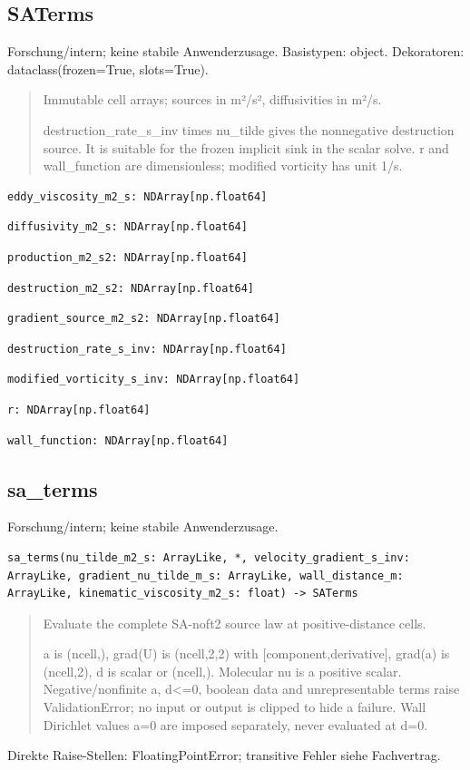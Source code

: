 \subsection{SATerms}
Forschung/intern; keine stabile Anwenderzusage.
Basistypen: object. Dekoratoren: dataclass(frozen=True, slots=True).
\begin{quote}
Immutable cell arrays; sources in m²/s², diffusivities in m²/s.\par destruction\_rate\_s\_inv times nu\_tilde gives the nonnegative destruction source. It is suitable for the frozen implicit sink in the scalar solve. r and wall\_function are dimensionless; modified vorticity has unit 1/s.
\end{quote}
\begin{lstlisting}
eddy_viscosity_m2_s: NDArray[np.float64]
\end{lstlisting}
\begin{lstlisting}
diffusivity_m2_s: NDArray[np.float64]
\end{lstlisting}
\begin{lstlisting}
production_m2_s2: NDArray[np.float64]
\end{lstlisting}
\begin{lstlisting}
destruction_m2_s2: NDArray[np.float64]
\end{lstlisting}
\begin{lstlisting}
gradient_source_m2_s2: NDArray[np.float64]
\end{lstlisting}
\begin{lstlisting}
destruction_rate_s_inv: NDArray[np.float64]
\end{lstlisting}
\begin{lstlisting}
modified_vorticity_s_inv: NDArray[np.float64]
\end{lstlisting}
\begin{lstlisting}
r: NDArray[np.float64]
\end{lstlisting}
\begin{lstlisting}
wall_function: NDArray[np.float64]
\end{lstlisting}
\subsection{sa\_terms}
Forschung/intern; keine stabile Anwenderzusage.
\begin{lstlisting}
sa_terms(nu_tilde_m2_s: ArrayLike, *, velocity_gradient_s_inv: ArrayLike, gradient_nu_tilde_m_s: ArrayLike, wall_distance_m: ArrayLike, kinematic_viscosity_m2_s: float) -> SATerms
\end{lstlisting}
\begin{quote}
Evaluate the complete SA-noft2 source law at positive-distance cells.\par a is (ncell,), grad(U) is (ncell,2,2) with [component,derivative], grad(a) is (ncell,2), d is scalar or (ncell,). Molecular nu is a positive scalar. Negative/nonfinite a, d<=0, boolean data and unrepresentable terms raise ValidationError; no input or output is clipped to hide a failure. Wall Dirichlet values a=0 are imposed separately, never evaluated at d=0.
\end{quote}
Direkte Raise-Stellen: FloatingPointError; transitive Fehler siehe Fachvertrag.
